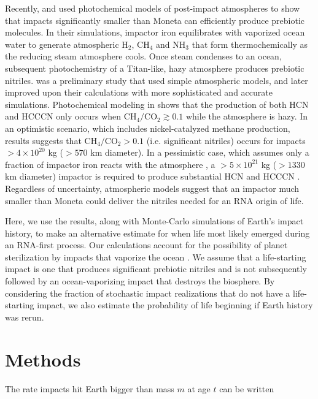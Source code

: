 \documentclass[manuscript]{aastex63}
\begin{document}
Recently, \citet{Wogan_2023} and \citet{Zahnle_2020} used photochemical models of post-impact atmospheres to show that impacts significantly smaller than Moneta can efficiently produce prebiotic molecules. In their simulations, impactor iron equilibrates with vaporized ocean water to generate atmospheric H$_2$, CH$_4$ and NH$_3$ that form thermochemically as the reducing steam atmosphere cools. Once steam condenses to an ocean, subsequent photochemistry of a Titan-like, hazy atmosphere produces prebiotic nitriles. \citet{Zahnle_2020} was a preliminary study that used simple atmospheric models, and later \citet{Wogan_2023} improved upon their calculations with more sophisticated and accurate simulations. Photochemical modeling in \citet{Wogan_2023} shows that the production of both HCN and HCCCN only occurs when $\mathrm{CH_4} / \mathrm{CO_2} \gtrsim 0.1$ while the atmosphere is hazy. In an optimistic scenario, which includes nickel-catalyzed methane production, results suggests that $\mathrm{CH_4} / \mathrm{CO_2} > 0.1$ (i.e. significant nitriles) occurs for impacts $> 4 \times 10^{20}$ kg ($> 570$ km diameter). In a pessimistic case, which assumes only a fraction of impactor iron reacts with the atmosphere \citep{Citron_2022}, a $> 5 \times 10^{21}$ kg ($> 1330$ km diameter) impactor is required to produce substantial HCN and HCCCN \citep{Wogan_2023}. Regardless of uncertainty, atmospheric models suggest that an impactor much smaller than Moneta could deliver the nitriles needed for an RNA origin of life.

Here, we use the \citet{Wogan_2023} results, along with Monte-Carlo simulations of Earth's impact history, to make an alternative estimate for when life most likely emerged during an RNA-first process. Our calculations account for the possibility of planet sterilization by impacts that vaporize the ocean \citep{Sleep_1989}. We assume that a life-starting impact is one that produces significant prebiotic nitriles and is not subsequently followed by an ocean-vaporizing impact that destroys the biosphere. By considering the fraction of stochastic impact realizations that do not have a life-starting impact, we also estimate the probability of life beginning if Earth history was rerun.

\section{Methods} \label{sec:methods}
The rate impacts hit Earth bigger than mass $m$ at age $t$ can be written
\end{document}
